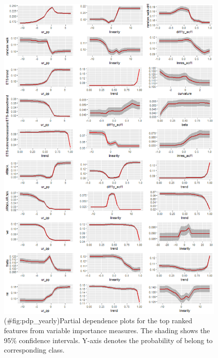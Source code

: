 \documentclass[11pt,a4paper,]{article}
\theoremstyle{definition}
\theoremstyle{definition}
\theoremstyle{definition}
\theoremstyle{remark}
\begin{document}
\begin{figure}
\centering
\includegraphics{figures/pdp_yearly-1.png}
\caption{(\#fig:pdp\_yearly)Partial dependence plots for the top ranked
features from variable importance measures. The shading shows the 95\%
confidence intervals. Y-axis denotes the probability of belong to
corresponding class.}
\end{figure}

\newpage
\end{document}
